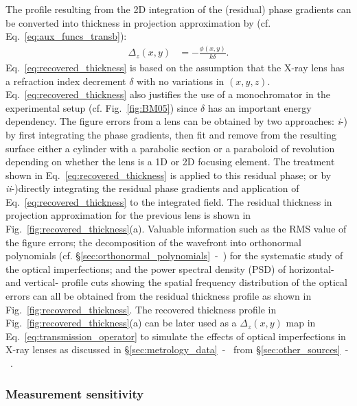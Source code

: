 \begin{refsection}
The profile resulting from the 2D integration of the (residual) phase gradients can be converted into thickness in projection approximation by (cf. Eq.~\ref{eq:aux_funcs_transb}):
\begin{align}\label{eq:recovered_thickness}
     \Delta_z(x,y)&=-\frac{\phi(x,y)}{k\delta}.
\end{align}{}
Eq.~\ref{eq:recovered_thickness} is based on the assumption that the X-ray lens has a refraction index decrement $\delta$ with no variations in $(x,y,z)$. Eq.~\ref{eq:recovered_thickness} also justifies the use of a monochromator in the experimental setup (cf. Fig.~\ref{fig:BM05}) since $\delta$ has an important energy dependency. The figure errors from a lens can be obtained by two approaches: \textit{i}-) by first integrating the phase gradients, then fit and remove from the resulting surface either a cylinder with a parabolic section or a paraboloid of revolution depending on whether the lens is a 1D or 2D focusing element. The treatment shown in Eq.~\ref{eq:recovered_thickness} is applied to this residual phase; or by \textit{ii}-)directly integrating the residual phase gradients and application of Eq.~\ref{eq:recovered_thickness} to the integrated field. The residual thickness in projection approximation for the previous lens is shown in Fig.~\ref{fig:recovered_thickness}(a). Valuable information such as the RMS value of the figure errors; the decomposition of the wavefront into orthonormal polynomials (cf. \S\ref{sec:orthonormal_polynomials}~-~\textit{}) for the systematic study of the optical imperfections; and the power spectral density (PSD) of horizontal- and vertical- profile cuts showing the spatial frequency distribution of the optical errors can all be obtained from the residual thickness profile as shown in Fig.~\ref{fig:recovered_thickness}. The recovered thickness profile in Fig.~\ref{fig:recovered_thickness}(a) can be later used as a $\Delta_z(x,y)$ map in Eq.~\ref{eq:transmission_operator} to simulate the effects of optical imperfections in X-ray lenses as discussed in \S\ref{sec:metrology_data}~-~\textit{} from \S\ref{sec:other_sources}~-~\textit{}. 

\subsubsection*{Measurement sensitivity}


\end{refsection}
